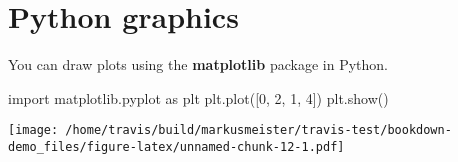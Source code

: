 \documentclass[]{book}
\newenvironment{Shaded}{\begin{snugshade}}{\end{snugshade}}
\newcommand{\DecValTok}[1]{\textcolor[rgb]{0.00,0.00,0.81}{#1}}
\newcommand{\ImportTok}[1]{#1}
\newcommand{\NormalTok}[1]{#1}
\begin{document}
\hypertarget{python-graphics}{%
\section{Python graphics}\label{python-graphics}}

You can draw plots using the \textbf{matplotlib} package in Python.

\begin{Shaded}
\begin{Highlighting}[]
\ImportTok{import}\NormalTok{ matplotlib.pyplot }\ImportTok{as}\NormalTok{ plt}
\NormalTok{plt.plot([}\DecValTok{0}\NormalTok{, }\DecValTok{2}\NormalTok{, }\DecValTok{1}\NormalTok{, }\DecValTok{4}\NormalTok{])}
\NormalTok{plt.show()}
\end{Highlighting}
\end{Shaded}

\texttt{[image: /home/travis/build/markusmeister/travis-test/bookdown-demo\_files/figure-latex/unnamed-chunk-12-1.pdf]}


\end{document}
